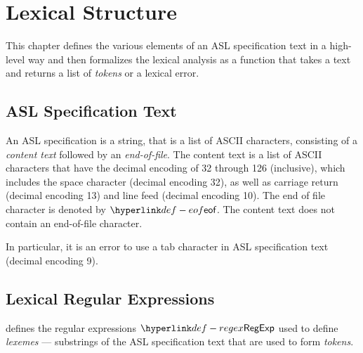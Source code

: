 \chapter{Lexical Structure\label{chap:LexicalStructure}}
This chapter defines the various elements of an ASL specification text in a high-level way
and then formalizes the lexical analysis as a function that takes a text and returns
a list of \emph{tokens} or a lexical error.

\section{ASL Specification Text}
An ASL specification is a string, that is a list of ASCII characters, consisting of a \emph{content text}
followed by an \emph{end-of-file}.
The content text is a list of
ASCII characters that have the decimal encoding of 32 through 126 (inclusive),
which includes the space character (decimal encoding 32),
as well as
carriage return (decimal encoding 13) and line feed (decimal encoding 10).
\hypertarget{def-eof}{}
The end of file character is denoted by $\eof$.
The content text does not contain an end-of-file character.

In particular, it is an error to use a tab character in ASL specification text (decimal encoding 9).

\section{Lexical Regular Expressions}

\hypertarget{def-regex}{}
 defines the regular expressions $\RegExp$ used to define
\emph{lexemes} --- substrings of the ASL specification text that are used to form \emph{tokens}.

